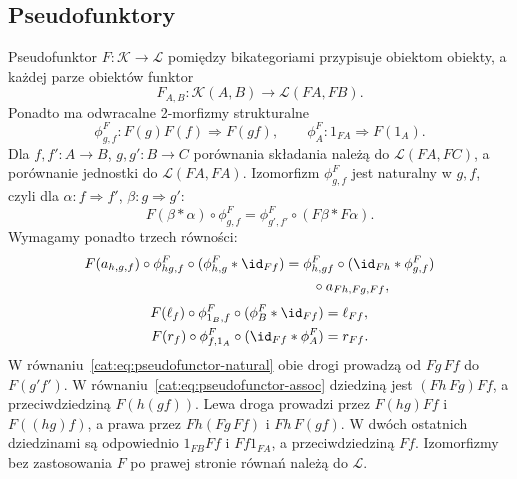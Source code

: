\subsection{Pseudofunktory}

\begin{definicja}[Pseudofunktor]\label{cat:def:pseudofunctor}
Pseudofunktor $F:\mathcal K\to\mathcal L$ pomiędzy bikategoriami przypisuje obiektom obiekty, a każdej parze obiektów funktor
\[
 F_{A,B}:\mathcal K(A,B)\to\mathcal L(FA,FB).
\]
Ponadto ma odwracalne 2-morfizmy strukturalne
\[
 \phi^F_{g,f}:F(g)F(f)\Rightarrow F(gf),\qquad
 \phi^F_A:1_{FA}\Rightarrow F(1_A).
\]
Dla $f,f':A\to B$, $g,g':B\to C$ porównania składania należą do $\mathcal L(FA,FC)$, a porównanie jednostki do $\mathcal L(FA,FA)$. Izomorfizm $\phi^F_{g,f}$ jest naturalny w $g,f$, czyli dla $\alpha:f\Rightarrow f'$, $\beta:g\Rightarrow g'$:
\begin{equation}\label{cat:eq:pseudofunctor-natural}
 F(\beta\ast\alpha)\circ\phi^F_{g,f}
 =\phi^F_{g',f'}\circ(F\beta\ast F\alpha).
\end{equation}
Wymagamy ponadto trzech równości:
\begin{equation}\label{cat:eq:pseudofunctor-assoc}
\begin{aligned}
 F(a_{h,g,f})\circ\phi^F_{hg,f}\circ
       (\phi^F_{h,g}\ast\id_{Ff})
 &=\phi^F_{h,gf}\circ(\id_{Fh}\ast\phi^F_{g,f})\\
 &\qquad\circ a_{Fh,Fg,Ff},
\end{aligned}
\end{equation}
\begin{equation}\label{cat:eq:pseudofunctor-unit}
\begin{aligned}
 F(\ell_f)\circ\phi^F_{1_B,f}
       \circ(\phi^F_B\ast\id_{Ff})&=\ell_{Ff},\\
 F(r_f)\circ\phi^F_{f,1_A}
       \circ(\id_{Ff}\ast\phi^F_A)&=r_{Ff}.
\end{aligned}
\end{equation}
W równaniu~\eqref{cat:eq:pseudofunctor-natural} obie drogi prowadzą od $Fg\,Ff$ do $F(g'f')$. W równaniu~\eqref{cat:eq:pseudofunctor-assoc} dziedziną jest $(Fh\,Fg)Ff$, a przeciwdziedziną $F(h(gf))$. Lewa droga prowadzi przez $F(hg)Ff$ i $F((hg)f)$, a prawa przez $Fh(Fg\,Ff)$ i $Fh\,F(gf)$. W dwóch ostatnich dziedzinami są odpowiednio $1_{FB}Ff$ i $Ff1_{FA}$, a przeciwdziedziną $Ff$. Izomorfizmy bez zastosowania $F$ po prawej stronie równań należą do $\mathcal L$.
\end{definicja}

